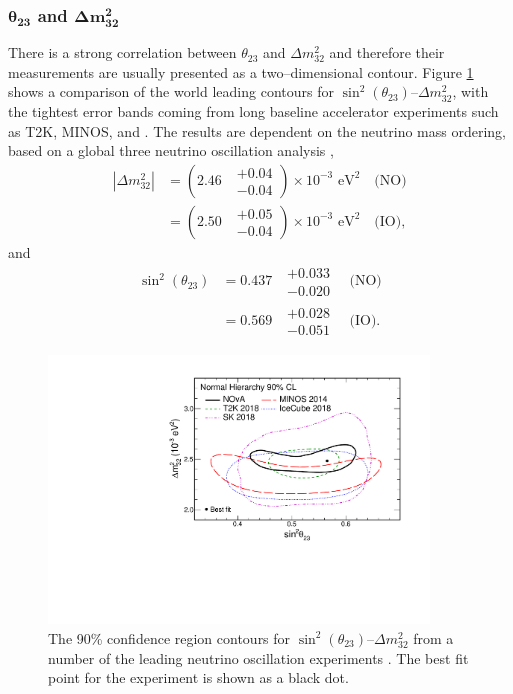 {\subsubsection*{$\boldsymbol{\theta_{23}}$ and $\boldsymbol{\Delta m^2_{32}}$}
There is a strong correlation between $\theta_{23}$ and $\Delta m^2_{32}$ and
therefore their measurements are usually presented as a two--dimensional
contour. Figure \ref{fig:delm_sin23} shows a comparison of the world leading
contours for $\sin^2 (\theta_{23})$--$\Delta m^2_{32}$, with the tightest error
bands coming from long baseline accelerator experiments such as T2K, MINOS, and 
\nova{} \cite{PhysRevD.96.092006, PhysRevLett.112.191801,
PhysRevLett.123.151803}. The results are dependent on the neutrino mass
ordering, based on a global three neutrino oscillation analysis 
\cite{Capozzi:2016rtj, TODO}, 
\begin{align}
	\label{eqn:delta_m_32}
	|\Delta m^2_{32}| &= (2.46 \mbox{ } \substack{+ 0.04 \\ - 0.04}) \times 10^{-3} \mbox{  eV}^2 \quad \mbox{(NO)} \\
	                  &= (2.50 \mbox{ } \substack{+ 0.05 \\ - 0.04}) \times 10^{-3} \mbox{  eV}^2 \quad \mbox{(IO)},
\end{align}
and 
\begin{align}
	\label{eqn:delta_m_32}
	\sin^2(\theta_{23}) &= 0.437 \mbox{  } \substack{+ 0.033 \\ - 0.020} \quad \mbox{(NO)} \\
	                    &= 0.569 \mbox{  } \substack{+ 0.028 \\ - 0.051} \quad \mbox{(IO)}.
\end{align}
\begin{figure}
	\centering
	\includegraphics[width=0.9\textwidth]{figures/theta23_msquare.pdf}
	\caption{The 90\% confidence region contours for 
	$\sin^2 (\theta_{23})$--$\Delta m^2_{32}$ from a number of the leading 
	neutrino oscillation experiments \cite{TODO}. The best fit point for the 
	\nova{} experiment is shown as a black dot. \cite{PhysRevLett.123.151803}}
	\label{fig:delm_sin23}
\end{figure}

}
